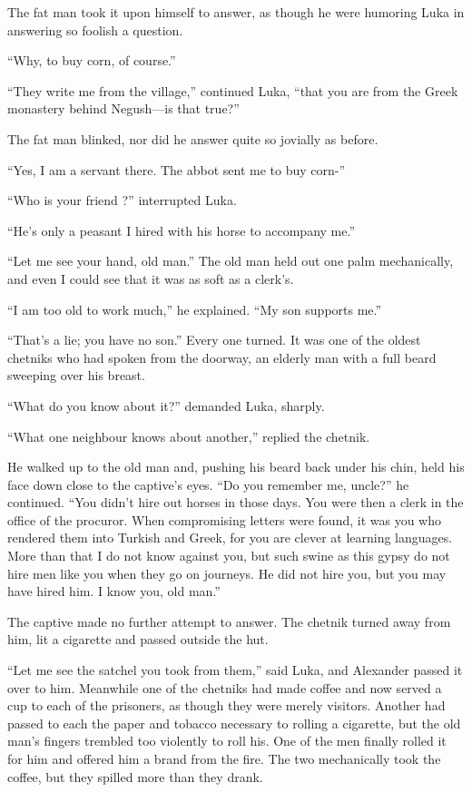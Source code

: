\documentclass[a5paper,12pt]{book}
\begin{document}
The fat man took it upon himself to answer, as though he were humoring Luka in answering so foolish a question. 

“Why, to buy corn, of course.” 

“They write me from the village,” continued Luka, “that you are from the Greek monastery behind Negush—is that true?” 

The fat man blinked, nor did he answer quite so jovially as before. 

“Yes, I am a servant there. The abbot sent me to buy corn-” 

“Who is your friend ?” interrupted Luka. 

“He’s only a peasant I hired with his horse to accompany me.” 

“Let me see your hand, old man.” The old man held out one palm mechanically, and even I could see that it was as soft as a clerk’s. 

“I am too old to work much,” he explained. “My son supports me.” 

“That’s a lie; you have no son.” Every one turned. It was one of the oldest chetniks who had spoken from the doorway, an elderly man with a full beard sweeping over his breast. 

“What do you know about it?” demanded Luka, sharply. 

“What one neighbour knows about another,” replied the chetnik. 

He walked up to the old man and, pushing his beard back under his chin, held his face down close to the captive’s eyes. “Do you remember me, uncle?” he continued. “You didn’t hire out horses in those days. You were then a clerk in the office of the procuror. When compromising letters were found, it was you who rendered them into Turkish and Greek, for you are clever at learning languages. More than that I do not know against you, but such swine as this gypsy do not hire men like you when they go on journeys. He did not hire you, but you may have hired him. I know you, old man.” 

The captive made no further attempt to answer. The chetnik turned away from him, lit a cigarette and passed outside the hut. 

“Let me see the satchel you took from them,” said Luka, and Alexander passed it over to him. Meanwhile one of the chetniks had made coffee and now served a cup to each of the prisoners, as though they were merely visitors. Another had passed to each the paper and tobacco necessary to rolling a cigarette, but the old man’s fingers trembled too violently to roll his. One of the men finally rolled it for him and offered him a brand from the fire. The two mechanically took the coffee, but they spilled more than they drank. 
\end{document}
